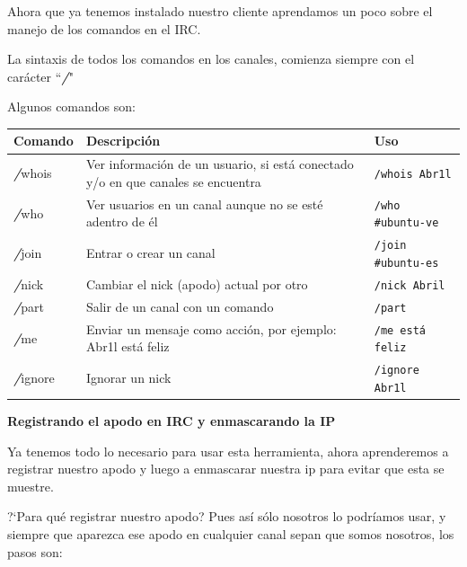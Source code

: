 \documentclass[12pt,letterpaper]{article}
\begin{document}
Ahora que ya tenemos instalado nuestro cliente aprendamos un poco sobre el manejo de los comandos en el IRC.

La sintaxis de todos los comandos en los canales, comienza siempre con el carácter ``{\bfseries\itshape /}"

Algunos comandos son:

\begin{tabularx}{15cm}{||l|X|l||}
\hline\hline
\textbf{Comando} & \textbf{Descripci\'on}  & \textbf{Uso} \\
\hline \hline
{\bfseries\itshape /}whois & Ver informaci\'on de un usuario, si está conectado y/o en que canales se encuentra & \texttt{/whois Abr1l} \\
\hline
{\bfseries\itshape /}who & Ver usuarios en un canal aunque no se esté adentro de él & \texttt{/who \#ubuntu-ve} \\
\hline 
{\bfseries\itshape /}join & Entrar o crear un canal & \texttt{/join \#ubuntu-es} \\
\hline
{\bfseries\itshape /}nick & Cambiar el nick (apodo) actual por otro & \texttt{/nick Abril} \\
\hline
{\bfseries\itshape /}part & Salir de un canal con un comando & \texttt{/part} \\
\hline 
{\bfseries\itshape /}me & Enviar un mensaje como acci\'on, por ejemplo: Abr1l est\'a feliz & \texttt{/me est\'a feliz} \\
\hline
{\bfseries\itshape /}ignore & Ignorar un nick & \texttt{/ignore Abr1l} \\
\hline\hline
\end{tabularx} 

\begin{center} %
{\bf \large Registrando el apodo en IRC y enmascarando la IP} %
\end{center}

Ya tenemos todo lo necesario para usar esta herramienta, ahora aprenderemos a registrar nuestro apodo y luego a enmascarar nuestra ip para evitar que esta se muestre.

?`Para qu\'e registrar nuestro apodo? Pues as\'i s\'olo nosotros lo podr\'iamos usar, y siempre que aparezca ese apodo en cualquier canal sepan que somos nosotros, los pasos son: 
\end{document}
